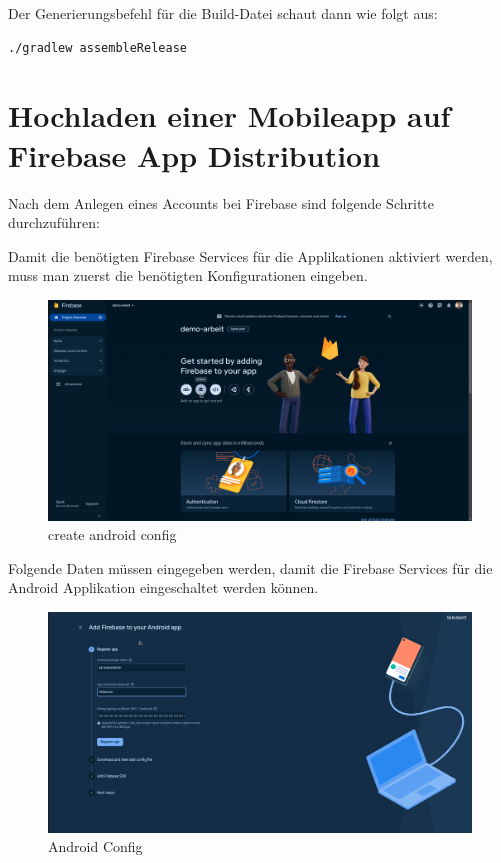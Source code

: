 Der Generierungsbefehl für die Build-Datei schaut dann wie folgt aus:

\begin{lstlisting}[language=bash,caption=generate apk]
 ./gradlew assembleRelease
 \end{lstlisting}





\section{Hochladen einer Mobileapp auf Firebase App Distribution}

Nach dem Anlegen eines Accounts bei Firebase sind folgende Schritte durchzuführen:

Damit die benötigten Firebase Services für die Applikationen aktiviert werden, muss man zuerst die benötigten Konfigurationen eingeben.
\begin{figure}[H]
  \includegraphics[width=\textwidth]{./pics/firebase1.png}
  \caption{create android config}
\end{figure}


Folgende Daten müssen eingegeben werden, damit die Firebase Services für die Android Applikation eingeschaltet werden können.

\begin{figure}[H]

  \includegraphics[width=\textwidth]{./pics/firebase2.png}
  \caption{Android Config}
\end{figure}

